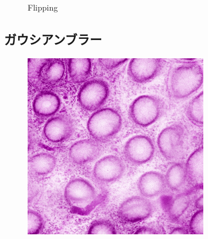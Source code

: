 \begin{figure}[H]
	\caption{Flipping}
	\label{fig:反転}

\end{figure}

\subsection*{ガウシアンブラー}

\begin{figure}[H]
	\centering

	\begin{minipage}{0.24\columnwidth}
		\centering
		\includegraphics[clip, width=\linewidth]{fig/preprocessing/data_aug/color/blur/blur_0_00}
	\end{minipage}
	\begin{minipage}{0.24\columnwidth}
		\centering

\end{minipage}
\end{figure}
